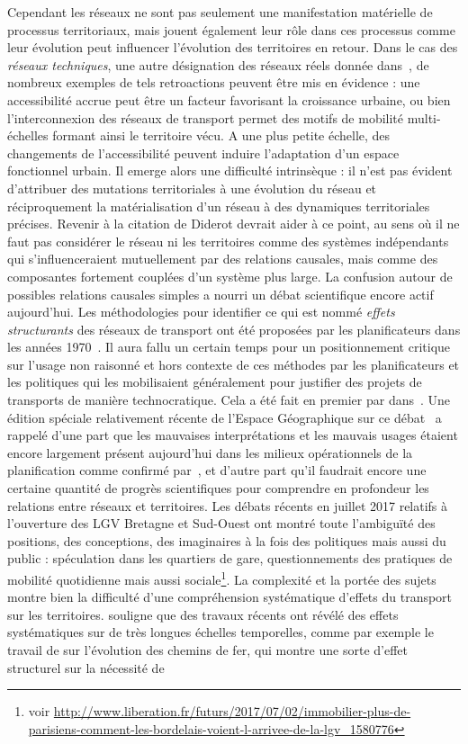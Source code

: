 {}{
Cependant les réseaux ne sont pas seulement une manifestation matérielle de processus territoriaux, mais jouent également leur rôle dans ces processus comme leur évolution peut influencer l'évolution des territoires en retour. Dans le cas des \emph{réseaux techniques}, une autre désignation des réseaux réels donnée dans~\cite{offner1996reseaux}, de nombreux exemples de tels retroactions peuvent être mis en évidence : une accessibilité accrue peut être un facteur favorisant la croissance urbaine, ou bien l'interconnexion des réseaux de transport permet des motifs de mobilité multi-échelles formant ainsi le territoire vécu. A une plus petite échelle, des changements de l'accessibilité peuvent induire l'adaptation d'un espace fonctionnel urbain. Il emerge alors une difficulté intrinsèque : il n'est pas évident d'attribuer des mutations territoriales à une évolution du réseau et réciproquement la matérialisation d'un réseau à des dynamiques territoriales précises. Revenir à la citation de Diderot devrait aider à ce point, au sens où il ne faut pas considérer le réseau ni les territoires comme des systèmes indépendants qui s'influenceraient mutuellement par des relations causales, mais comme des composantes fortement couplées d'un système plus large. La confusion autour de possibles relations causales simples a nourri un débat scientifique encore actif aujourd'hui. Les méthodologies pour identifier ce qui est nommé \emph{effets structurants} des réseaux de transport ont été proposées par les planificateurs dans les années 1970~\cite{bonnafous1974detection,bonnafous1974methodologies}. Il aura fallu un certain temps pour un positionnement critique sur l'usage non raisonné et hors contexte de ces méthodes par les planificateurs et les politiques qui les mobilisaient généralement pour justifier des projets de transports de manière technocratique. Cela a été fait en premier par  dans~\cite{offner1993effets}. Une édition spéciale relativement récente de l'Espace Géographique sur ce débat~\cite{espacegeo2014effets} a rappelé d'une part que les mauvaises interprétations et les mauvais usages étaient encore largement présent aujourd'hui dans les milieux opérationnels de la planification comme confirmé par~\cite{crozet:halshs-01094554}, et d'autre part qu'il faudrait encore une certaine quantité de progrès scientifiques pour comprendre en profondeur les relations entre réseaux et territoires. Les débats récents en juillet 2017 relatifs à l'ouverture des LGV Bretagne et Sud-Ouest ont montré toute l'ambiguïté des positions, des conceptions, des imaginaires à la fois des politiques mais aussi du public : spéculation dans les quartiers de gare, questionnements des pratiques de mobilité quotidienne mais aussi sociale\footnote{voir \url{http://www.liberation.fr/futurs/2017/07/02/immobilier-plus-de-parisiens-comment-les-bordelais-voient-l-arrivee-de-la-lgv_1580776}}. La complexité et la portée des sujets montre bien la difficulté d'une compréhension systématique d'effets du transport sur les territoires.  souligne que des travaux récents ont révélé des effets systématiques sur de très longues échelles temporelles, comme par exemple le travail de  sur l'évolution des chemins de fer, qui montre une sorte d'effet structurel sur la nécessité de }
